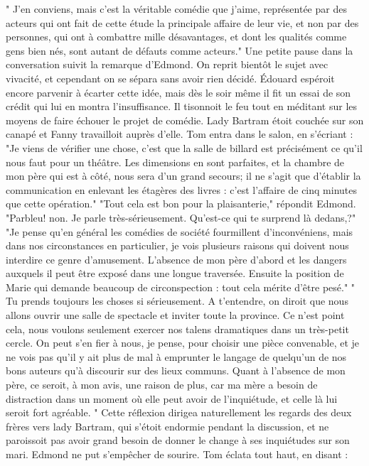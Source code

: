 " J'en conviens, mais c'est la véritable comédie que j'aime, représentée par des acteurs qui ont fait de cette étude la principale affaire de leur vie, et non par des personnes, qui ont à combattre mille désavantages, et dont les qualités comme gens bien nés, sont autant de défauts comme acteurs."
Une petite pause dans la conversation suivit la remarque d'Edmond. On reprit bientôt le sujet avec vivacité, et cependant on se sépara sans avoir rien décidé. Édouard espéroit encore parvenir à écarter cette idée,\setcounter{page}{104} mais dès le soir même il fit un essai de son crédit qui lui en montra l'insuffisance.
Il tisonnoit le feu tout en méditant sur les moyens de faire échouer le projet de comédie. Lady Bartram étoit couchée sur son canapé et Fanny travailloit auprès d'elle.
Tom entra dans le salon, en s'écriant : "Je viens de vérifier une chose, c'est que la salle de billard est précisément ce qu'il nous faut pour un théâtre. Les dimensions en sont parfaites, et la chambre de mon père qui est à côté, nous sera d'un grand secours; il ne s'agit que d'établir la communication en enlevant les étagères des livres : c'est l'affaire de cinq minutes que cette opération."
"Tout cela est bon pour la plaisanterie," répondit Edmond.
"Parbleu! non. Je parle très-sérieusement. Qu'est-ce qui te surprend là dedans,?"
"Je pense qu'en général les comédies de société fourmillent d'inconvéniens, mais dans nos circonstances en particulier, je vois plusieurs raisons qui doivent nous interdire ce genre d'amusement. L'absence de mon père d'abord et les dangers auxquels il peut être exposé dans une longue traversée. Ensuite la position de Marie qui demande beaucoup de circonspection : tout cela mérite d'être pesé."\setcounter{page}{105} " Tu prends toujours les choses si sérieusement. A t’entendre, on diroit que nous allons ouvrir une salle de spectacle et inviter toute la province. Ce n’est point cela, nous voulons seulement exercer nos talens dramatiques dans un très-petit cercle. On peut s’en fier à nous, je pense, pour choisir une pièce convenable, et je ne vois pas qu’il y ait plus de mal à emprunter le langage de quelqu’un de nos bons auteurs qu’à discourir sur des lieux communs. Quant à l’absence de mon père, ce seroit, à mon avis, une raison de plus, car ma mère a besoin de distraction dans un moment où elle peut avoir de l’inquiétude, et celle là lui seroit fort agréable. " Cette réflexion dirigea naturellement les regards des deux frères vers lady Bartram, qui s’étoit endormie pendant la discussion, et ne paroissoit pas avoir grand besoin de donner le change à ses inquiétudes sur son mari. Edmond ne put s’empêcher de sourire. Tom éclata tout haut, en disant :
